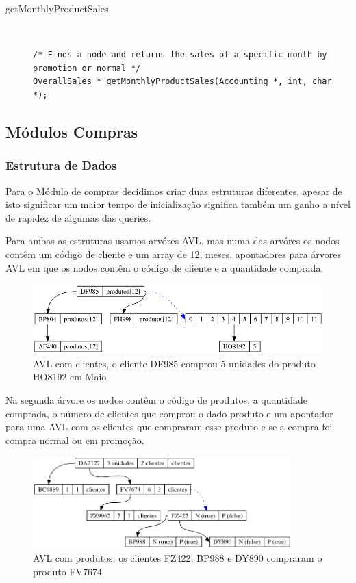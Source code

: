 \documentclass[10pt] {article}
\begin{document}
\begin{description}
\item[getMonthlyProductSales] \hfill \\
\begin{lstlisting}
/* Finds a node and returns the sales of a specific month by promotion or normal */
OverallSales * getMonthlyProductSales(Accounting *, int, char *);
\end{lstlisting}


\end{description}

\subsection{Módulos Compras}

\subsubsection{Estrutura de Dados}
\indent\par Para o Módulo de compras decidimos criar duas estruturas diferentes, apesar de isto significar um maior 
tempo  de inicialização significa também um ganho a nível de rapidez de algumas das queries.
 \par Para ambas as estruturas usamos arvóres AVL, mas numa das arvóres os nodos contêm um código de cliente 
 e um array de 12, meses, apontadores para árvores AVL em que os nodos contêm o código de cliente e a 
 quantidade comprada.
 
\begin{figure}[ht!]
\centering
\includegraphics[width=120mm]{avl_salesc.png}
\caption{AVL com clientes, o cliente DF985 comprou 5 unidades do produto HO8192 em Maio}
\end{figure}

\par Na segunda árvore os nodos contêm o código de produtos, a quantidade comprada, o número de clientes que 
 comprou o dado produto e um apontador para uma AVL com os clientes que compraram esse produto e se a 
 compra foi compra normal ou em promoção.

\begin{figure}[ht!]
\centering
\includegraphics[width=100mm]{avl_salesp.png}
\caption{AVL com produtos, os clientes FZ422, BP988 e DY890 compraram o produto FV7674}
\end{figure}
 
\end{document}
